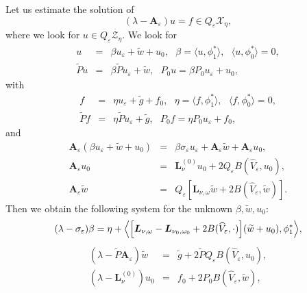 \documentclass[11pt]{article}
\begin{document}
Let us estimate the solution of%
\begin{equation*}
(\lambda -\boldsymbol{A}_{\varepsilon })u=f\in Q_{\varepsilon }\mathcal{X}%
_{\eta},
\end{equation*}%
where we look for $u\in Q_{\varepsilon }\mathcal{Z}_{\eta}.$ We look for 
\begin{eqnarray*}
u &=&\beta u_{\varepsilon }+\widetilde{w}+u_{0},\text{ }\beta =\langle
u,\phi _{1}^{\ast }\rangle ,\text{ }\langle u,\phi _{0}^{\ast }\rangle =0, \\
\widetilde{P}u &=&\beta \widetilde{P}u_{\varepsilon }+\widetilde{w},\text{ }%
P_{0}u=\beta P_{0}u_{\varepsilon }+u_{0},
\end{eqnarray*}%
with%
\begin{eqnarray*}
f &=&\eta u_{\varepsilon }+\widetilde{g}+f_{0},\text{ }\eta =\langle f,\phi
_{1}^{\ast }\rangle ,\text{ }\langle f,\phi _{0}^{\ast }\rangle =0, \\
\widetilde{P}f &=&\eta \widetilde{P}u_{\varepsilon }+\widetilde{g},\text{ }%
P_{0}f=\eta P_{0}u_{\varepsilon }+f_{0},
\end{eqnarray*}%
and%
\begin{eqnarray*}
\boldsymbol{A}_{\varepsilon }(\beta u_{\varepsilon }+\widetilde{w}+u_{0})
&=&\beta \sigma _{\varepsilon }u_{\varepsilon }+\boldsymbol{A}_{\varepsilon }%
\widetilde{w}+\boldsymbol{A}_{\varepsilon }u_{0}, \\
\boldsymbol{A}_{\varepsilon }u_{0} &=&\boldsymbol{L}_{\nu
}^{(0)}u_{0}+2Q_{\varepsilon }B(\widehat{V}_{\varepsilon },u_{0}), \\
\boldsymbol{A}_{\varepsilon }\widetilde{w} &=&Q_{\varepsilon }[\boldsymbol{L}%
_{\nu ,\omega }\widetilde{w}+2B(\widehat{V}_{\varepsilon },\widetilde{w})].
\end{eqnarray*}%
Then we obtain the following system for the unknown $\beta ,\widetilde{w}%
,u_{0}:$%
\begin{equation}
(\lambda -\sigma _{\varepsilon })\beta =\eta + \Bigl\langle \Bigl[ \boldsymbol{L}%
_{\nu ,\omega }-\boldsymbol{L}_{\nu _{0},\omega _{0}}+2B(\widehat{V}%
_{\varepsilon },\cdot ) \Bigr](\widetilde{w}+u_{0}),\phi _{1}^{\ast }\Bigr\rangle ,
\label{equ beta}
\end{equation}%
\begin{eqnarray}
(\lambda -\widetilde{P}\boldsymbol{A}_{\varepsilon })\widetilde{w} &=&%
\widetilde{g}+2\widetilde{P}Q_{\varepsilon }B(\widehat{V}_{\varepsilon
},u_{0}),  \label{equ wtilde} \\
(\lambda -\boldsymbol{L}_{\nu }^{(0)})u_{0} &=&f_{0}+2P_{0}B(\widehat{V}%
_{\varepsilon },\widetilde{w}),  \label{equ u0}
\end{eqnarray}%
\end{document}
